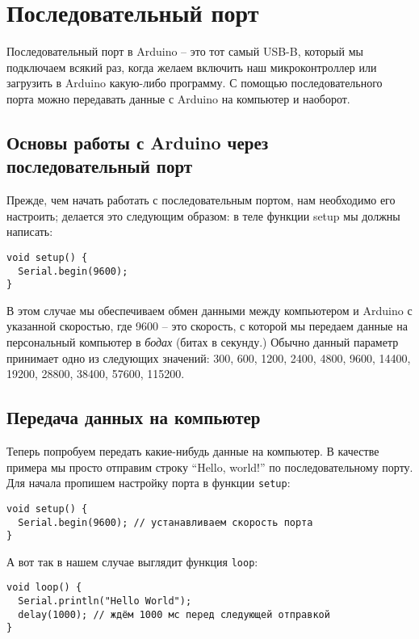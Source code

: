 \documentclass[../sparc.tex]{subfiles}
\begin{document}
\section{Последовательный порт}

Последовательный порт в Arduino -- это тот самый USB-B, который мы подключаем
всякий раз, когда желаем включить наш микроконтроллер или загрузить в Arduino
какую-либо программу.  С помощью последовательного порта можно передавать данные
с Arduino на компьютер и наоборот.

\subsection{Основы работы с Arduino через последовательный порт}

Прежде, чем начать работать с последовательным портом, нам необходимо его
настроить; делается это следующим образом: в теле функции setup мы должны
написать:

\begin{verbatim}
void setup() {
  Serial.begin(9600);
}
\end{verbatim}

В этом случае мы обеспечиваем обмен данными между компьютером и Arduino с
указанной скоростью, где 9600 -- это скорость, с которой мы передаем данные на
персональный компьютер в \emph{бодах} (битах в секунду.) Обычно данный параметр
принимает одно из следующих значений: 300, 600, 1200, 2400, 4800, 9600, 14400,
19200, 28800, 38400, 57600, 115200.

\subsection{Передача данных на компьютер}

Теперь попробуем передать какие-нибудь данные на компьютер. В качестве примера
мы просто отправим строку ``Hello, world!'' по последовательному порту. Для
начала пропишем настройку порта в функции \texttt{setup}:

\begin{verbatim}
void setup() {
  Serial.begin(9600); // устанавливаем скорость порта
}
\end{verbatim}

А вот так в нашем случае выглядит функция \texttt{loop}:

\begin{verbatim}
void loop() {
  Serial.println("Hello World");
  delay(1000); // ждём 1000 мс перед следующей отправкой
}
\end{verbatim}
\end{document}
